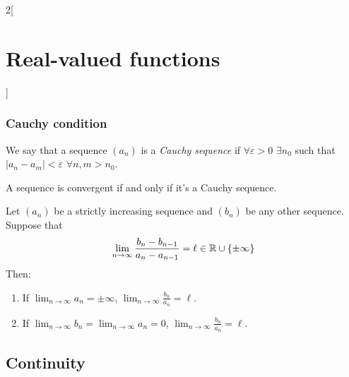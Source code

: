 \documentclass[../../../main.tex]{subfiles}
\begin{document}
\begin{multicols}{2}[\section{Real-valued functions}]
\subsubsection*{Cauchy condition}
\begin{definition}
    We say that a sequence $(a_n)$ is a \textit{Cauchy sequence} if $\forall \varepsilon>0$ $\exists n_0$ such that $|a_n-a_m|<\varepsilon$ $\forall n,m>n_0$.
\end{definition}
\begin{theorem}
    A sequence is convergent if and only if it's a Cauchy sequence.
\end{theorem}
\begin{theorem}
    Let $(a_n)$ be a strictly increasing sequence and $(b_n)$ be any other sequence. Suppose that $$\lim_{n\to\infty}\frac{b_n-b_{n-1}}{a_n-a_{n-1}}=\ell\in\mathbb{R}\cup\{\pm\infty\}$$ Then:
    \begin{enumerate}
        \item If $\displaystyle\lim_{n\to\infty} a_n=\pm\infty$, $\displaystyle\lim_{n\to\infty}\frac{b_n}{a_n}=\ell$.
        \item If $\displaystyle\lim_{n\to\infty} b_n=\displaystyle\lim_{n\to\infty} a_n=0$, $\displaystyle\lim_{n\to\infty}\frac{b_n}{a_n}=\ell$.
    \end{enumerate}
\end{theorem}
\subsection{Continuity}

\end{multicols}
\end{document}
